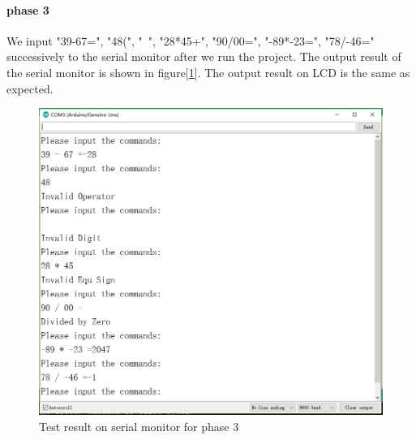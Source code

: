 \paragraph{phase 3}
We input "39-67=", "48(", "~", "28*45+", "90/00=", "-89*-23=", "78/-46=" successively to the serial monitor after we run the project. The output result of the serial monitor is shown in figure[\ref{fig:test3}]. The output result on LCD is the same as expected.
\begin{figure}[!htbp]
	\centering
	\includegraphics[width = \linewidth]{images/test3.png}
	\caption{Test result on serial monitor for phase 3}
	\label{fig:test3}
\end{figure}

